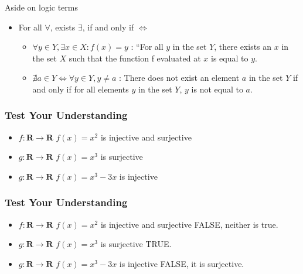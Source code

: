 \documentclass[aspectratio=169]{beamer}
\numberwithin{equation}{section}
\begin{document}
\begin{frame}{Aside on logic terms}

\begin{itemize}
\item For all $\forall$, exists $\exists$, if and only if $\iff$
\begin{itemize}

\item $\forall y\in Y, \exists x\in X: f(x)=y$ : ``For all $y$ in the set $Y$, there exists an $x$ in the set $X$ such that the function f evaluated at $x$ is equal to $y$.

\item $\nexists a \in Y \iff \forall y \in Y,  y\neq a$ : There does not exist an element $a$ in the set $Y$ if and only if for all elements $y$ in the set $Y$, $y$ is not equal to $a$.
\end{itemize}
\end{itemize}
\end{frame}



\begin{frame}
\frametitle{Test Your Understanding}

\begin{itemize}
\item $f: \mathbf{R}\rightarrow \mathbf{R}$ $f(x)=x^2$ is injective and surjective
\item $g: \mathbf{R}\rightarrow \mathbf{R}$ $f(x)=x^3$ is surjective
\item  $g: \mathbf{R}\rightarrow \mathbf{R}$ $f(x)=x^3-3x$ is injective
\end{itemize}
   
\end{frame}

\begin{frame}
\frametitle{Test Your Understanding}


\begin{itemize}
\item $f: \mathbf{R}\rightarrow \mathbf{R}$ $f(x)=x^2$ is injective and surjective FALSE, neither is true.
\item $g: \mathbf{R}\rightarrow \mathbf{R}$ $f(x)=x^3$ is surjective TRUE. 
\item  $g: \mathbf{R}\rightarrow \mathbf{R}$ $f(x)=x^3-3x$ is injective FALSE, it is surjective.
\end{itemize}
   
\end{frame}
\end{document}
